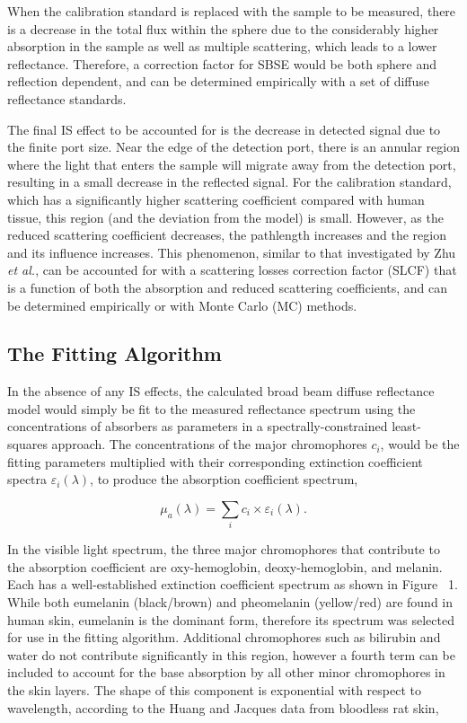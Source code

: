 When the calibration standard is replaced with the sample to be measured, there is a decrease in the total flux within the sphere due to the considerably higher absorption in the sample as well as multiple scattering, which leads to a lower reflectance. Therefore, a correction factor for SBSE would be both sphere and reflection dependent, and can be determined empirically with a set of diffuse reflectance standards.\cite{Labspherec,Glennie2014b}

The final IS effect to be accounted for is the decrease in detected signal due to the finite port size. Near the edge of the detection port, there is an annular region where the light that enters the sample will migrate away from the detection port, resulting in a small decrease in the reflected signal. For the calibration standard, which has a significantly higher scattering coefficient compared with human tissue,\cite{Tseng2008} this region (and the deviation from the model) is small. However, as the reduced scattering coefficient decreases, the pathlength increases and the region and its influence increases. This phenomenon, similar to that investigated by Zhu \emph{et al.},\cite{Zhu2014} can be accounted for with a scattering losses correction factor (SLCF) that is a function of both the absorption and reduced scattering coefficients, and can be determined empirically or with Monte Carlo (MC) methods.

\subsection{The Fitting Algorithm}
\label{sec:fitting_algorithm}
In the absence of any IS effects, the calculated broad beam diffuse reflectance model would simply be fit to the measured reflectance spectrum using the concentrations of absorbers as parameters in a spectrally-constrained least-squares approach. The concentrations of the major chromophores $c_i$, would be the fitting parameters multiplied with their corresponding extinction coefficient spectra $\varepsilon_i(\lambda)$, to produce the absorption coefficient spectrum,

\begin{equation}
\mu_a(\lambda) = \sum_i c_i \times \varepsilon_i(\lambda).
\end{equation}

In the visible light spectrum, the three major chromophores that contribute to the absorption coefficient are oxy-hemoglobin, deoxy-hemoglobin, and melanin. Each has a well-established extinction coefficient spectrum as shown in Figure~ 1.\cite{Prahl2001} While both eumelanin (black/brown) and pheomelanin (yellow/red) are found in human skin, eumelanin is the dominant form, therefore its spectrum was selected for use in the fitting algorithm. Additional chromophores such as bilirubin and water do not contribute significantly in this region, however a fourth term can be included to account for the base absorption by all other minor chromophores in the skin layers. The shape of this component is exponential with respect to wavelength, according to the Huang and Jacques data from bloodless rat skin,\cite{Jacques1998}

